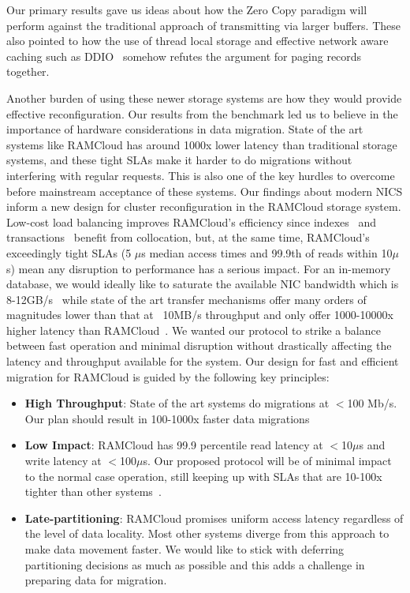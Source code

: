 Our primary results gave us ideas about how the Zero Copy paradigm will perform against
the traditional approach of transmitting via larger buffers. These also pointed 
to how the use of thread local storage and effective network aware caching such as DDIO~\cite{ddio}
somehow refutes the argument for paging records together.

Another burden of using these newer storage systems are how they would provide effective 
reconfiguration. Our results from the benchmark led us to believe in the importance of 
hardware considerations in data migration. State of the art systems like RAMCloud has around 1000x
lower latency than traditional storage systems, and these tight SLAs make it harder to do migrations
without interfering with regular requests. This is also one of the key hurdles 
to overcome before mainstream acceptance of these systems.
Our findings about modern NICS inform a new design for cluster reconfiguration
in the RAMCloud storage system. Low-cost load balancing improves RAMCloud’s
efficiency since indexes~\cite{slik} and transactions~\cite{ramcloudtx} benefit from collocation, but, at the same time, RAMCloud’s exceedingly tight SLAs (5 $\mu$s median
access times and 99.9th of reads within 10$\mu$s) mean any disruption to performance
has a serious impact. For an in-memory database, we would ideally like to saturate the
available NIC bandwidth which is 8-12GB/s~\cite{cx3,cx4} while state of the art 
transfer mechanisms offer many orders of magnitudes lower than that at ~10MB/s 
throughput and only offer 1000-10000x higher latency than RAMCloud~\cite{ramcloud}.
We wanted our protocol to strike a balance between fast operation and minimal disruption without drastically affecting
the latency and throughput available for the system. Our design for fast and efficient migration
for RAMCloud is guided by the following key principles:
\begin{itemize}
\item{\textbf{High Throughput}}: State of the art systems do migrations at $<$100 Mb/s. Our plan
should result in 100-1000x faster data migrations
\item{\textbf{Low Impact}}: RAMCloud has 99.9 percentile read latency at $<$10$\mu$s and write latency
at $<$100$\mu$s. Our proposed protocol will be of minimal impact to the normal case operation, still keeping
up with SLAs that are 10-100x tighter than other systems~\cite{squall}.
\item{\textbf{Late-partitioning}}: RAMCloud promises uniform access latency regardless of the level of data locality.
Most other systems diverge from this approach to make data movement faster. We would like to stick with
deferring partitioning decisions as much as possible and this adds a challenge in preparing data for migration.
\end{itemize}


